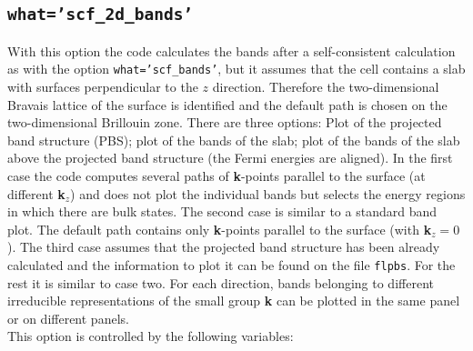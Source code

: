 \documentclass[12pt,a4paper]{article}
\begin{document}
\subsection{\texttt{what='scf\_2d\_bands'}}
With this option the code calculates the bands after a self-consistent 
calculation as with the option \texttt{what='scf\_bands'}, but it assumes 
that the cell contains a slab with surfaces perpendicular to the $z$ 
direction. Therefore the two-dimensional Bravais lattice of the surface 
is identified and the default path is chosen on the two-dimensional 
Brillouin zone. 
There are three options: Plot of the projected band structure (PBS); 
plot of the bands of the slab; plot of the bands of the slab above the
projected band structure (the Fermi energies are aligned). In the first 
case the code computes several paths
of {\bf k}-points parallel to the surface (at different {\bf k}$_z$) and does 
not plot the individual bands but selects the energy regions in which 
there are bulk states. The second case is similar to a standard band plot. 
The default path contains only {\bf k}-points parallel to the 
surface (with {\bf k}$_z=0$). The third case assumes that the projected band 
structure has been already calculated and the information to plot it 
can be found on the file \texttt{flpbs}. For the rest it is 
similar to case two. For each direction, bands belonging to different 
irreducible representations of the small group {\bf k} can be plotted 
in the same panel or on different panels.\\
This option is controlled by the following variables:
\end{document}
